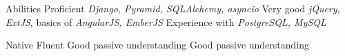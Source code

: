 \begin{rubric}{Abilities}
\entry*[Python]
	Proficient\newline
    \textit{Django, Pyramid, SQLAlchemy, asyncio}
\entry*[JavaScript]
	Very good\newline
    \textit{jQuery, ExtJS}, basics of \textit{AngularJS, EmberJS}
\entry*[Databases]
    Experience with \textit{PostgreSQL, MySQL}

\entry*[Polish]
    Native
\entry*[English]
	Fluent
\entry*[Russian]
	Good passive understanding
	Good passive understanding
\end{rubric}
